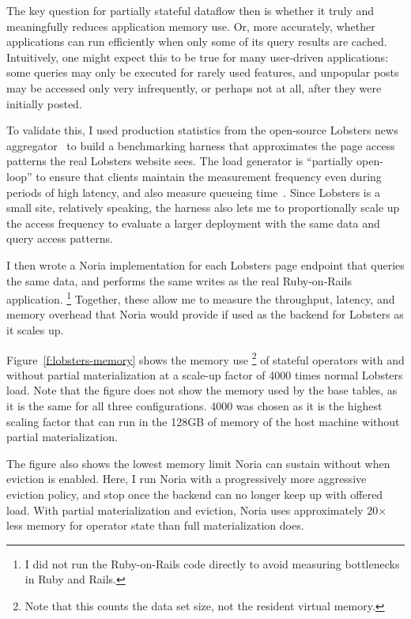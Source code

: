 The key question for partially stateful dataflow then is whether it truly and
meaningfully reduces application memory use. Or, more accurately, whether
applications can run efficiently when only some of its query results are cached.
Intuitively, one might expect this to be true for many user-driven applications:
some queries may only be executed for rarely used features, and unpopular posts
may be accessed only very infrequently, or perhaps not at all, after they were
initially posted.

To validate this, I used production statistics from the open-source Lobsters
news aggregator~\cite{lobsters,lobsters-data} to build a benchmarking harness
that approximates the page access patterns the real Lobsters website sees. The
load generator is ``partially open-loop'' to ensure that clients maintain the
measurement frequency even during periods of high latency, and also measure
queueing time~\cite{frank-open-loop,open-loop-cautionary-tale}. Since Lobsters
is a small site, relatively speaking, the harness also lets me to proportionally
scale up the access frequency to evaluate a larger deployment with the same
data and query access patterns.

I then wrote a Noria implementation for each Lobsters page endpoint that
queries the same data, and performs the same writes as the real Ruby-on-Rails
application.%
\footnote{I did not run the Ruby-on-Rails code directly to avoid measuring
bottlenecks in Ruby and Rails.}
Together, these allow me to measure the throughput, latency, and memory overhead
that Noria would provide if used as the backend for Lobsters as it scales up.

Figure~\ref{f:lobsters-memory} shows the memory use%
\footnote{Note that this counts the data set size, not the resident virtual
memory.}
of stateful operators with
and without partial materialization at a scale-up factor of 4000 times normal
Lobsters load. Note that the figure does not show the memory used by the base
tables, as it is the same for all three configurations. 4000 was chosen as it is
the highest scaling factor that can run in the 128GB of memory of the host
machine without partial materialization.

The figure also shows the lowest memory limit Noria can sustain without when
eviction is enabled. Here, I run Noria with a progressively more aggressive
eviction policy, and stop once the backend can no longer keep up with offered
load. With partial materialization and eviction, Noria uses approximately
20$\times$ less memory for operator state than full materialization does.

